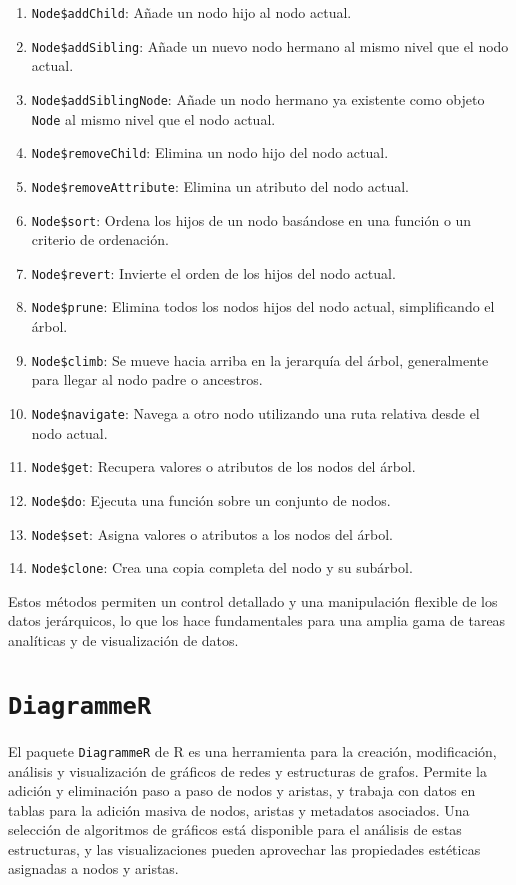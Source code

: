 \documentclass[12pt]{report}\usepackage[]{graphicx}\usepackage[dvipsnames]{xcolor}
\begin{document}
			 	\begin{enumerate}
			 		\item \texttt{Node\$addChild}: Añade un nodo hijo al nodo actual.
			 		\item \texttt{Node\$addSibling}: Añade un nuevo nodo hermano al mismo nivel que el nodo actual.
			 		\item \texttt{Node\$addSiblingNode}: Añade un nodo hermano ya existente como objeto \texttt{Node} al mismo nivel que el nodo actual.
			 		\item \texttt{Node\$removeChild}: Elimina un nodo hijo del nodo actual.
			 		\item \texttt{Node\$removeAttribute}: Elimina un atributo del nodo actual.
			 		\item \texttt{Node\$sort}: Ordena los hijos de un nodo basándose en una función o un criterio de ordenación.
			 		\item \texttt{Node\$revert}: Invierte el orden de los hijos del nodo actual.
			 		\item \texttt{Node\$prune}: Elimina todos los nodos hijos del nodo actual, simplificando el árbol.
			 		\item \texttt{Node\$climb}: Se mueve hacia arriba en la jerarquía del árbol, generalmente para llegar al nodo padre o ancestros.
			 		\item \texttt{Node\$navigate}: Navega a otro nodo utilizando una ruta relativa desde el nodo actual.
			 		\item \texttt{Node\$get}: Recupera valores o atributos de los nodos del árbol.
			 		\item \texttt{Node\$do}: Ejecuta una función sobre un conjunto de nodos.
			 		\item \texttt{Node\$set}: Asigna valores o atributos a los nodos del árbol.
			 		\item \texttt{Node\$clone}: Crea una copia completa del nodo y su subárbol.
			 	\end{enumerate}
			 	
			 	Estos métodos permiten un control detallado y una manipulación flexible de los datos jerárquicos, lo que los hace fundamentales para una amplia gama de tareas analíticas y de visualización de datos.
 	
 		\section{\texttt{DiagrammeR}}
 	
		 	El paquete \texttt{DiagrammeR} de R es una herramienta para la creación, modificación, análisis y visualización de gráficos de redes y estructuras de grafos. Permite la adición y eliminación paso a paso de nodos y aristas, y trabaja con datos en tablas para la adición masiva de nodos, aristas y metadatos asociados. Una selección de algoritmos de gráficos está disponible para el análisis de estas estructuras, y las visualizaciones pueden aprovechar las propiedades estéticas asignadas a nodos y aristas.\\
		 	
\end{document}
